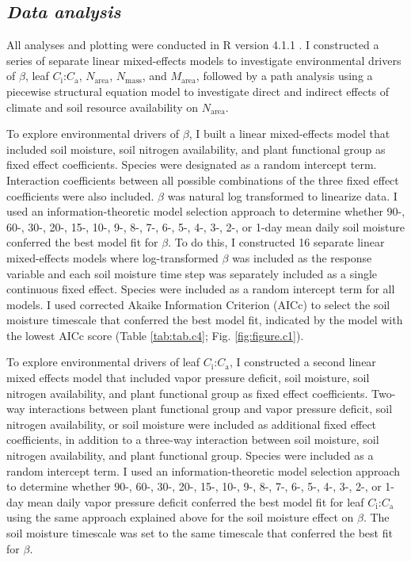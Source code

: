\subsection{\textit{Data analysis}}
\noindent All analyses and plotting were conducted in R version 4.1.1 . I constructed a series of separate linear mixed-effects models to investigate environmental drivers of $\beta$, leaf $C_\mathrm{i}$:$C_\mathrm{a}$, $N_\mathrm{area}$, $N_\mathrm{mass}$, and $M_\mathrm{area}$, followed by a path analysis using a piecewise structural equation model to investigate direct and indirect effects of climate and soil resource availability on $N_\mathrm{area}$.

To explore environmental drivers of $\beta$, I built a linear mixed-effects model that included soil moisture, soil nitrogen availability, and plant functional group as fixed effect coefficients. Species were designated as a random intercept term. Interaction coefficients between all possible combinations of the three fixed effect coefficients were also included. $\beta$ was natural log transformed to linearize data. I used an information-theoretic model selection approach to determine whether 90-, 60-, 30-, 20-, 15-, 10-, 9-, 8-, 7-, 6-, 5-, 4-, 3-, 2-, or 1-day mean daily soil moisture conferred the best model fit for $\beta$. To do this, I constructed 16 separate linear mixed-effects models where log-transformed $\beta$ was included as the response variable and each soil moisture time step was separately included as a single continuous fixed effect. Species were included as a random intercept term for all models. I used corrected Akaike Information Criterion (AICc) to select the soil moisture timescale that conferred the best model fit, indicated by the model with the lowest AICc score (Table \ref{tab:tab.c4}; Fig. \ref{fig:figure.c1}).

To explore environmental drivers of leaf $C_\mathrm{i}$:$C_\mathrm{a}$, I constructed a second linear mixed effects model that included vapor pressure deficit, soil moisture, soil nitrogen availability, and plant functional group as fixed effect coefficients. Two-way interactions between plant functional group and vapor pressure deficit, soil nitrogen availability, or soil moisture were included as additional fixed effect coefficients, in addition to a three-way interaction between soil moisture, soil nitrogen availability, and plant functional group. Species were included as a random intercept term. I used an information-theoretic model selection approach to determine whether 90-, 60-, 30-, 20-, 15-, 10-, 9-, 8-, 7-, 6-, 5-, 4-, 3-, 2-, or 1-day mean daily vapor pressure deficit conferred the best model fit for leaf $C_\mathrm{i}$:$C_\mathrm{a}$ using the same approach explained above for the soil moisture effect on $\beta$. The soil moisture timescale was set to the same timescale that conferred the best fit for $\beta$.

